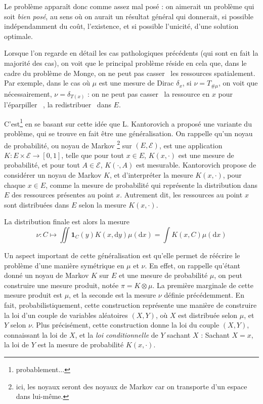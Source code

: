 \documentclass[12pt]{article}
\begin{document}
Le problème apparaît donc comme assez mal posé : on aimerait un problème qui soit \textit{bien posé}, au sens où on aurait un résultat général qui donnerait, si possible indépendamment du coût, l'existence, et si possible l'unicité, d'une solution optimale.

Lorsque l'on regarde en détail les cas pathologiques précédents (qui sont en fait la majorité des cas), on voit que le principal problème réside en cela que, dans le cadre du problème de Monge, on ne peut pas \og casser \fg\, les ressources spatialement. Par exemple, dans le cas où $ \mu $ est une mesure de Dirac $ \delta_x $, si $ \nu = T_{\#\mu} $, on voit que nécessairement, $ \nu = \delta_{T(x)} $ : on ne peut pas \og casser \fg\, la ressource en $x$ pour \og l'éparpiller \fg \, , la \og redistribuer \fg \, dans $E$.

C'est\footnote{probablement...} en se basant sur cette idée que L. Kantorovich a proposé une variante du problème, qui se trouve en fait être une généralisation. On rappelle qu'un noyau de probabilité, ou noyau de Markov \footnote{ici, les noyaux seront des noyaux de Markov car on transporte d'un espace dans lui-même.} sur $(E, \mathcal E)$, est une application $ K : E \times \mathcal E \to [0,1] $, telle que pour tout $x \in E$, $ K(x, \cdot )$ est une mesure de probabilité, et pour tout $ A \in \mathcal E $, $K(\cdot, A)$ est mesurable. Kantorovich propose de considérer un noyau de Markov $ K $, et d'interpréter la mesure $ K(x, \cdot) $, pour chaque $ x \in E $, comme la mesure de probabilité qui représente la distribution dans $E$ des ressources présentes au point $x$. Autrement dit, les ressources au point $x$ sont distribuées dans $E$ selon la mesure $ K(x, \cdot) $. 

La distribution finale est alors la mesure $$ \nu : C \mapsto \iint \mathbf{1}_C(y) K(x,\mathrm dy) \mu (\mathrm d x) = \int K(x,C) \mu (\mathrm d x) $$

Un aspect important de cette généralisation est qu'elle permet de réécrire le problème d'une manière symétrique en $\mu$ et $ \nu $. En effet, on rappelle qu'étant donné un noyau de Markov $K$ sur $E$ et une mesure de probabilité $ \mu $, on peut construire une mesure produit, notée $ \pi = K \otimes \mu $. La première marginale de cette mesure produit est $ \mu $, et la seconde est la mesure $ \nu $ définie précédemment. En fait, probabilistiquement, cette construction représente une manière de construire la loi d'un couple de variables aléatoires $(X,Y)$, où $X$ est distribuée selon $ \mu $, et $ Y $ selon $ \nu $. Plus précisément, cette construction donne la loi du couple $(X,Y)$, connaissant la loi de $X$, et la \textit{loi conditionnelle} de $Y$ sachant $X$ : Sachant $X = x$, la loi de $Y$ est la mesure de probabilité $K(x, \cdot) $.
\end{document}

